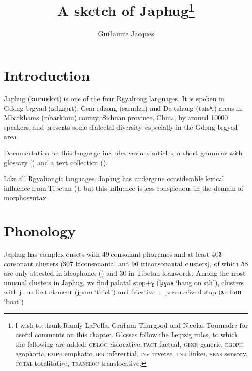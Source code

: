 \documentclass[oldfontcommands,oneside,a4paper,11pt]{article}
\newcommand{\ipa}[1]{{\phon#1}} %
\begin{document}
 

\title{A sketch of Japhug\footnote{I wish to thank Randy LaPolla, Graham Thurgood and Nicolas Tournadre for useful comments on this chapter. Glosses follow the Leipzig rules, to which the following are added: \textsc{cisloc} cislocative, \textsc{fact} factual, \textsc{genr} generic, \textsc{egoph} egophoric, \textsc{emph} emphatic, \textsc{ifr} inferential, \textsc{inv} inverse, \textsc{lnk} linker, \textsc{sens} sensory, \textsc{total} totalitative, \textsc{transloc} translocative. }}
\author{Guillaume Jacques}
\maketitle


\section{Introduction}
Japhug (\ipa{kɯrɯskɤt}) is one of the four Rgyalrong languages. It is spoken in Gdong-brgyad (\ipa{ʁdɯrɟɤt}), Gsar-rdzong (\ipa{sarndzu}) and Da-tshang (\ipa{tatsʰi}) areas in Mbarkhams (\ipa{mbarkʰom}) county, Sichuan province, China, by around 10000 speakers, and presents some dialectal diversity, especially in the Gdong-brgyad area.

Documentation on this language includes various articles, a short grammar with glossary (\citealt{jacques08}) and a text collection (\citealt{jacques10gesar}).

Like all Rgyalrongic languages, Japhug has undergone considerable lexical influence from Tibetan (\citealt{jacques04these}), but this influence is less conspicuous in the domain of morphosyntax.



\section{Phonology}
Japhug has complex onsets with 49 consonant phonemes and at least 403 consonant clusters (307 biconsonantal and 96 triconsonantal clusters), of which 58 are only attested in ideophones (\citealt{japhug14ideophones}) and 30 in Tibetan loanwords. Among the most unusual clusters in Japhug, we find palatal stop+\ipa{ɣ} (\ipa{lɟɣaʁ} `hang on sth'), clusters with \ipa{j--} as first element (\ipa{jpum} `thick') and fricative + prenasalized stop (\ipa{ʑmbrɯ} `boat')
\end{document}
